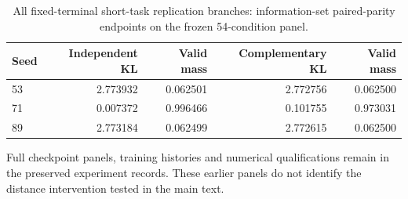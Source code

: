 \documentclass{article}
\begin{document}
\begin{table}[h]
\centering\small
\caption{All fixed-terminal short-task replication branches: information-set
paired-parity endpoints on the frozen 54-condition panel.}
\label{tab:prior-terminal}
\begin{tabular}{@{}lrrrr@{}}
\toprule
Seed & Independent KL & Valid mass & Complementary KL & Valid mass\\
\midrule
53 & 2.773932 & 0.062501 & 2.772756 & 0.062500\\
71 & 0.007372 & 0.996466 & 0.101755 & 0.973031\\
89 & 2.773184 & 0.062499 & 2.772615 & 0.062500\\
\bottomrule
\end{tabular}
\end{table}



Full checkpoint panels, training histories and numerical qualifications remain
in the preserved experiment records. These earlier panels do not identify
the distance intervention tested in the main text.
\end{document}
